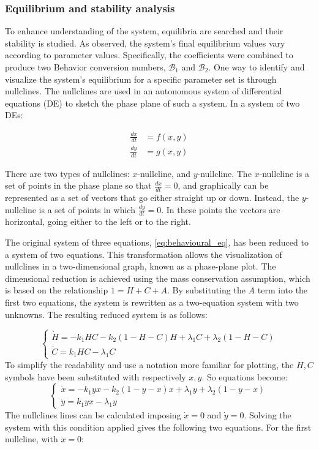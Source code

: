 \subsubsection{Equilibrium and stability analysis}
To enhance understanding of the system, equilibria are searched and their stability is studied. As observed, the system’s final equilibrium values vary according to parameter values. Specifically, the coefficients were combined to produce two Behavior conversion numbers, $\mathcal{B}_1$ and $\mathcal{B}_2$. One way to identify and visualize the system’s equilibrium for a specific parameter set is through nullclines.
The nullclines are used in an autonomous system of differential equations (DE)  to sketch the phase plane of such a system. In a system of two DEs: 
  
\begin{align}
	\frac{dx}{dt} &= f(x,y) \\
	\frac{dy}{dt} &= g(x,y)
\end{align}

There are two types of nullclines: $x$-nullcline, and $y$-nullcline. The $x$-nullcline is a set of points in the phase plane so that $\frac{dx}{dt} =0$, and graphically can be represented as a set of vectors that go either straight up or down. Instead, the $y$-nullcline is a set of points in which $\frac{dy}{dt} =0$. In these points the vectors are horizontal, going either to the left or to the right.

The original system of three equations, \ref{eq:behavioural_eq}, has been reduced to a system of two equations. This transformation allows the visualization of nullclines in a two-dimensional graph, known as a phase-plane plot. The dimensional reduction is achieved using the mass conservation assumption, which is based on the relationship $1 = H + C + A$. By substituting the $A$ term into the first two equations, the system is rewritten as a two-equation system with two unknowns. The resulting reduced system is as follows:

\[
\begin{cases}
	\dot{H} = -k_1 H C - k_2 (1-H-C) H + \lambda_1 C + \lambda_2 (1-H-C)\\
	\dot{C} = k_1 H C - \lambda_1 C
\end{cases}
\]
To simplify the readability and use a notation more familiar for plotting, the $H, C$ symbols have been substituted with respectively $x, y$. So equations become:
\begin{equation}
\label{eq:system_nullclines}
\begin{cases}
	\dot{x} = -k_1 y x - k_2 (1-y-x) x + \lambda_1 y + \lambda_2 (1-y-x)\\
	\dot{y} = k_1 y x - \lambda_1 y
\end{cases}
\end{equation}
The nullclines lines can be calculated imposing $\dot{x} = 0$ and $\dot{y} = 0$. Solving the system with this condition applied gives the following two equations. For the first nullcline, with $\dot{x} = 0$:

